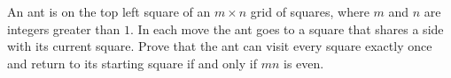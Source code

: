 An ant is on the top left square of an $m\times n$ grid of squares, where $m$ and $n$ are integers greater than $1$. In each move the ant goes to a square that shares a side with its current square. Prove that the ant can visit every square exactly once and return to its starting square if and only if $mn$ is even.
